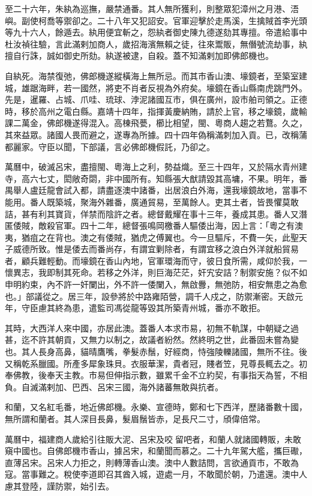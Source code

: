 \begin{pinyinscope}
至二十六年，朱紈為巡撫，嚴禁通番。其人無所獲利，則整眾犯漳州之月港、浯嶼。副使柯喬等禦卻之。二十八年又犯詔安。官軍迎擊於走馬溪，生擒賊首李光頭等九十六人，餘遁去。紈用便宜斬之，怨紈者御史陳九德遂劾其專擅。帝遣給事中杜汝禎往驗，言此滿剌加商人，歲招海濱無賴之徒，往來鬻販，無僭號流劫事，紈擅自行誅，誠如御史所劾。紈遂被逮，自殺。蓋不知滿剌加即佛郎機也。

自紈死。海禁復弛，佛郎機遂縱橫海上無所忌。而其市香山澳、壕鏡者，至築室建城，雄踞海畔，若一國然，將吏不肖者反視為外府矣。壕鏡在香山縣南虎跳門外。先是，暹羅、占城、爪哇、琉球、浡泥諸國互市，俱在廣州，設市舶司領之。正德時，移於高州之電白縣。嘉靖十四年，指揮黃慶納賄，請於上官，移之壕鏡，歲輸課二萬金，佛郎機遂得混入。高棟飛甍，櫛比相望，閩、粵商人趨之若鶩。久之，其來益眾。諸國人畏而避之，遂專為所據。四十四年偽稱滿刺加入貢。已，改稱蒲都麗家。守臣以聞，下部議，言必佛郎機假託，乃卻之。

萬曆中，破滅呂宋，盡擅閩、粵海上之利，勢益熾。至三十四年，又於隔水青州建寺，高六七丈，閎敞奇閟，非中國所有。知縣張大猷請毀其高墉，不果。明年，番禺舉人盧廷龍會試入都，請盡逐澳中諸番，出居浪白外海，還我壕鏡故地，當事不能用。番人既築城，聚海外雜番，廣通貿易，至萬餘人。吏其土者，皆畏懼莫敢詰，甚有利其寶貨，佯禁而陰許之者。總督戴耀在事十三年，養成其患。番人又潛匿倭賊，敵殺官軍。四十二年，總督張鳴岡檄番人驅倭出海，因上言：「粵之有澳夷，猶疽之在背也。澳之有倭賊，猶虎之傅翼也。今一旦驅斥，不費一矢，此聖天子威德所致。惟是倭去而番尚存，有謂宜剿除者，有謂宜移之浪白外洋就船貿易者，顧兵難輕動。而壕鏡在香山內地，官軍環海而守，彼日食所需，咸仰於我，一懷異志，我即制其死命。若移之外洋，則巨海茫茫，奸宄安詰？制禦安施？似不如申明約束，內不許一奸闌出，外不許一倭闌入，無啟釁，無弛防，相安無患之為愈也。」部議從之。居三年，設參將於中路雍陌營，調千人戍之，防禦漸密。天啟元年，守臣慮其終為患，遣監司馮從龍等毀其所築青州城，番亦不敢拒。

其時，大西洋人來中國，亦居此澳。蓋番人本求市易，初無不軌謀，中朝疑之過甚，迄不許其朝貢，又無力以制之，故議者紛然。然終明之世，此番固未嘗為變也。其人長身高鼻，貓晴鷹嘴，拳髮赤鬚，好經商，恃強陵轢諸國，無所不往。後又稱乾系臘國。所產多犀象珠貝。衣服華潔，貴者冠，賤者笠，見尊長輒去之。初奉佛教，後奉天主教。市易但伸指示數，雖累千金不立約契，有事指天為誓，不相負。自滅滿剌加、巴西、呂宋三國，海外諸蕃無敢與抗者。

和蘭，又名紅毛番，地近佛郎機。永樂、宣德時，鄭和七下西洋，歷諸番數十國，無所謂和蘭者。其人深目長鼻，髮眉鬚皆赤，足長尺二寸，頎偉倍常。

萬曆中，福建商人歲給引往販大泥、呂宋及咬留吧者，和蘭人就諸國轉販，未敢窺中國也。自佛郎機市香山，據呂宋，和蘭聞而慕之。二十九年駕大艦，攜巨礮，直薄呂宋。呂宋人力拒之，則轉薄香山澳。澳中人數詰問，言欲通貢市，不敢為寇。當事難之。稅使李道即召其酋入城，遊處一月，不敢聞於朝，乃遣還。澳中人慮其登陸，謹防禦，始引去。


\end{pinyinscope}
